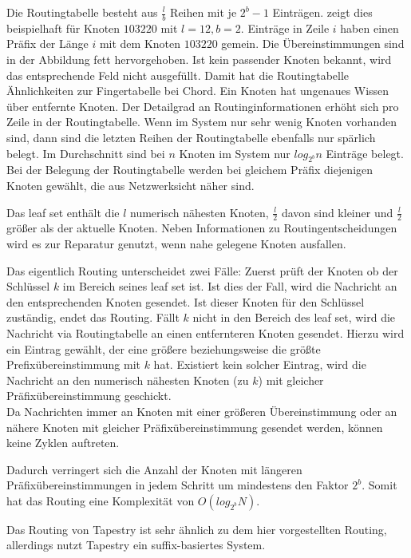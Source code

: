 Die Routingtabelle besteht aus $\frac{l}{b}$ Reihen mit je $2^b -1$ Einträgen.  zeigt dies beispielhaft für Knoten $103220$ mit $l=12, b=2$. Einträge in Zeile $i$ haben einen Präfix der Länge $i$ mit dem Knoten $103220$ gemein. Die Übereinstimmungen sind in der Abbildung fett hervorgehoben. Ist kein passender Knoten bekannt, wird das entsprechende Feld nicht ausgefüllt. Damit hat die Routingtabelle Ähnlichkeiten zur Fingertabelle bei Chord. Ein Knoten hat ungenaues Wissen über entfernte Knoten. Der Detailgrad an Routinginformationen erhöht sich pro Zeile in der Routingtabelle. Wenn im System nur sehr wenig Knoten vorhanden sind, dann sind die letzten Reihen der Routingtabelle ebenfalls nur spärlich belegt. Im Durchschnitt sind bei $n$ Knoten im System nur $log_{2^b} n$ Einträge belegt.\\
Bei der Belegung der Routingtabelle werden bei gleichem Präfix diejenigen Knoten gewählt, die aus Netzwerksicht näher sind.

Das leaf set enthält die $l$ numerisch nähesten Knoten, $\frac{l}{2}$ davon sind kleiner und $\frac{l}{2}$ größer als der aktuelle Knoten. Neben Informationen zu Routingentscheidungen wird es zur Reparatur genutzt, wenn nahe gelegene Knoten ausfallen.

Das eigentlich Routing unterscheidet zwei Fälle: Zuerst prüft der Knoten ob der Schlüssel $k$ im Bereich seines leaf set ist. Ist dies der Fall, wird die Nachricht an den entsprechenden Knoten gesendet. Ist dieser Knoten für den Schlüssel zuständig, endet das Routing. Fällt $k$ nicht in den Bereich des leaf set, wird die Nachricht via Routingtabelle an einen entfernteren Knoten gesendet. Hierzu wird ein Eintrag gewählt, der eine größere beziehungsweise die größte Prefixübereinstimmung mit $k$ hat. Existiert kein solcher Eintrag, wird die Nachricht an den numerisch nähesten Knoten (zu $k$) mit gleicher Präfixübereinstimmung geschickt.\\
Da Nachrichten immer an Knoten mit einer größeren Übereinstimmung oder an nähere Knoten mit gleicher Präfixübereinstimmung gesendet werden, können keine Zyklen auftreten.

Dadurch verringert sich die Anzahl der Knoten mit längeren Präfixübereinstimmungen in jedem Schritt um mindestens den Faktor $2^b$. Somit hat das Routing eine Komplexität von $O(log_{2^b} N)$.

Das Routing von Tapestry ist sehr ähnlich zu dem hier vorgestellten Routing, allerdings nutzt Tapestry ein suffix-basiertes System.

